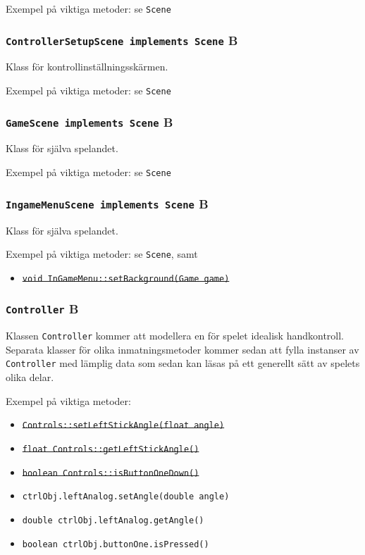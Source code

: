 \documentclass[a4paper,11pt]{article}
\begin{document}
\bigskip
\noindent Exempel på viktiga metoder: se \texttt{Scene}

\subsubsection{\texttt{ControllerSetupScene implements Scene} B}
\noindent Klass för kontrollinställningsskärmen.

\bigskip
\noindent Exempel på viktiga metoder: se \texttt{Scene}

\subsubsection{\texttt{GameScene implements Scene} B}
\noindent Klass för själva spelandet.

\bigskip
\noindent Exempel på viktiga metoder: se \texttt{Scene}

\subsubsection{\texttt{IngameMenuScene implements Scene} B}
\noindent Klass för själva spelandet.

\bigskip
\noindent Exempel på viktiga metoder: se \texttt{Scene}, samt
\begin{itemize}
\item \sout{\texttt{void InGameMenu::setBackground(Game game)}}
\end{itemize}

\subsubsection{\texttt{Controller} B}
\noindent Klassen \texttt{Controller} kommer att modellera en för spelet idealisk handkontroll.
Separata klasser för olika inmatningsmetoder kommer sedan att fylla instanser av \texttt{Controller}
med lämplig data som sedan kan läsas på ett generellt sätt av spelets olika delar.

\bigskip
\noindent Exempel på viktiga metoder:
\begin{itemize}
\item \sout{\texttt{Controls::setLeftStickAngle(float angle)}}
\item \sout{\texttt{float Controls::getLeftStickAngle()}}
\item \sout{\texttt{boolean Controls::isButtonOneDown()}}

\item \texttt{ctrlObj.leftAnalog.setAngle(double angle)}
\item \texttt{double ctrlObj.leftAnalog.getAngle()}
\item \texttt{boolean ctrlObj.buttonOne.isPressed()}
\end{itemize}
\end{document}
